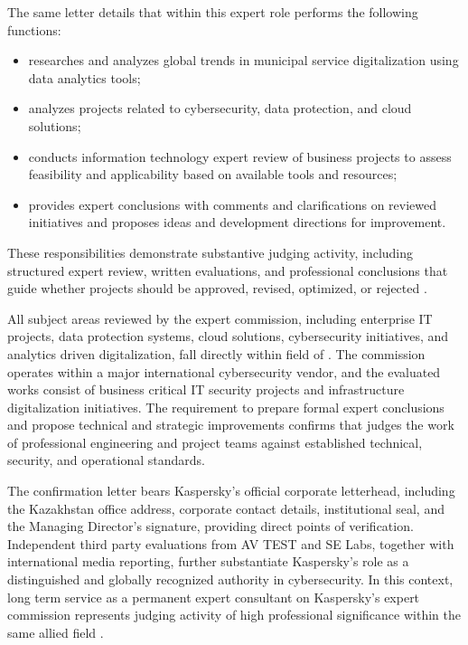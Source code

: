 The same letter details that within this expert role \mrl{} performs the following functions:
\vspace{-0.5\baselineskip}
\begin{itemize}[nosep]
\item researches and analyzes global trends in municipal service digitalization using data analytics tools;
\item analyzes projects related to cybersecurity, data protection, and cloud solutions;
\item conducts information technology expert review of business projects to assess feasibility and applicability based on available tools and resources;
\item provides expert conclusions with comments and clarifications on reviewed initiatives and proposes ideas and development directions for improvement.
\end{itemize}
These responsibilities demonstrate substantive judging activity, including structured expert review, written evaluations, and professional conclusions that guide whether projects should be approved, revised, optimized, or rejected .

All subject areas reviewed by the expert commission, including enterprise IT projects, data protection systems, cloud solutions, cybersecurity initiatives, and analytics driven digitalization, fall directly within \mrls field of \fie. The commission operates within a major international cybersecurity vendor, and the evaluated works consist of business critical IT security projects and infrastructure digitalization initiatives. The requirement to prepare formal expert conclusions and propose technical and strategic improvements confirms that \mrl{} judges the work of professional engineering and project teams against established technical, security, and operational standards.

The confirmation letter bears Kaspersky’s official corporate letterhead, including the Kazakhstan office address, corporate contact details, institutional seal, and the Managing Director’s signature, providing direct points of verification. Independent third party evaluations from AV TEST and SE Labs, together with international media reporting, further substantiate Kaspersky’s role as a distinguished and globally recognized authority in cybersecurity. In this context, \mrls long term service as a permanent expert consultant on Kaspersky’s expert commission represents judging activity of high professional significance within the same allied field .


